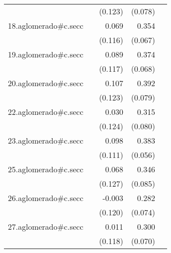 {\begin{longtable}{l*{4}{D{.}{.}{-1}}}
            &                     &     (0.123)         &     (0.078)         &                     \\
\addlinespace
18.aglomerado#c.secc&                     &       0.069         &       0.354\sym{***}&                     \\
            &                     &     (0.116)         &     (0.067)         &                     \\
\addlinespace
19.aglomerado#c.secc&                     &       0.089         &       0.374\sym{***}&                     \\
            &                     &     (0.117)         &     (0.068)         &                     \\
\addlinespace
20.aglomerado#c.secc&                     &       0.107         &       0.392\sym{***}&                     \\
            &                     &     (0.123)         &     (0.079)         &                     \\
\addlinespace
22.aglomerado#c.secc&                     &       0.030         &       0.315\sym{***}&                     \\
            &                     &     (0.124)         &     (0.080)         &                     \\
\addlinespace
23.aglomerado#c.secc&                     &       0.098         &       0.383\sym{***}&                     \\
            &                     &     (0.111)         &     (0.056)         &                     \\
\addlinespace
25.aglomerado#c.secc&                     &       0.068         &       0.346\sym{***}&                     \\
            &                     &     (0.127)         &     (0.085)         &                     \\
\addlinespace
26.aglomerado#c.secc&                     &      -0.003         &       0.282\sym{***}&                     \\
            &                     &     (0.120)         &     (0.074)         &                     \\
\addlinespace
27.aglomerado#c.secc&                     &       0.011         &       0.300\sym{***}&                     \\
            &                     &     (0.118)         &     (0.070)         &                     \\

\end{longtable}}
